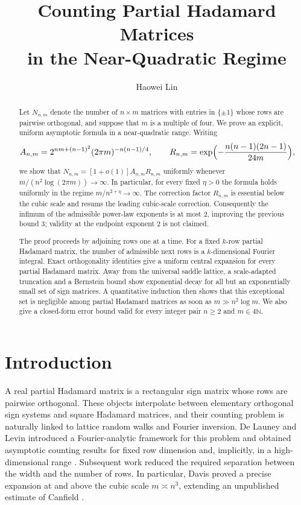 \documentclass[11pt,reqno]{amsart}
\title[Counting Partial Hadamard Matrices in the Near-Quadratic Regime]
{Counting Partial Hadamard Matrices\\in the Near-Quadratic Regime}
\author{Haowei Lin}
\date{}
\theoremstyle{plain}
\theoremstyle{definition}
\theoremstyle{remark}
\newcommand{\N}{\mathbb N}
\begin{document}
\begin{abstract}
Let \(N_{n,m}\) denote the number of \(n\times m\) matrices with entries in
\(\{\pm1\}\) whose rows are pairwise orthogonal, and suppose that \(m\) is a
multiple of four. We prove an explicit, uniform asymptotic formula in a
near-quadratic range. Writing
\[
  A_{n,m}=2^{nm+(n-1)^2}(2\pi m)^{-n(n-1)/4},\qquad
  R_{n,m}=\exp\Bigl(-\frac{n(n-1)(2n-1)}{24m}\Bigr),
\]
we show that \(N_{n,m}=[1+o(1)]A_{n,m}R_{n,m}\) uniformly whenever
\(m/(n^2\log(2\pi m))\to\infty\). In particular, for every fixed \(\eta>0\) the
formula holds uniformly in the regime \(m/n^{2+\eta}\to\infty\). The correction
factor \(R_{n,m}\) is essential below the cubic scale and resums the leading
cubic-scale correction. Consequently the infimum of the admissible power-law
exponents is at most \(2\), improving the previous bound \(3\); validity at the
endpoint exponent \(2\) is not claimed.

The proof proceeds by adjoining rows one at a time. For a fixed \(k\)-row
partial Hadamard matrix, the number of admissible next rows is a
\(k\)-dimensional Fourier integral. Exact orthogonality identities give a
uniform central expansion for every partial Hadamard matrix. Away from the
universal saddle lattice, a scale-adapted truncation and a Bernstein bound show
exponential decay for all but an exponentially small set of sign matrices. A
quantitative induction then shows that this exceptional set is negligible among
partial Hadamard matrices as soon as \(m\gg n^2\log m\). We also give a
closed-form error bound valid for every integer pair \(n\ge2\) and
\(m\in4\N\).
\end{abstract}

\maketitle

\section{Introduction}

A real partial Hadamard matrix is a rectangular sign matrix whose rows are
pairwise orthogonal. These objects interpolate between elementary orthogonal
sign systems and square Hadamard matrices, and their counting problem is
naturally linked to lattice random walks and Fourier inversion. De Launey and
Levin introduced a Fourier-analytic framework for this problem and obtained
asymptotic counting results for fixed row dimension and, implicitly, in a
high-dimensional range \cite{deLauneyLevin2010}. Subsequent work reduced the
required separation between the width and the number of rows. In particular,
Davis proved a precise expansion at and above the cubic scale \(m\asymp n^3\),
extending an unpublished estimate of Canfield \cite{Canfield2011,Davis2026}.
\end{document}
